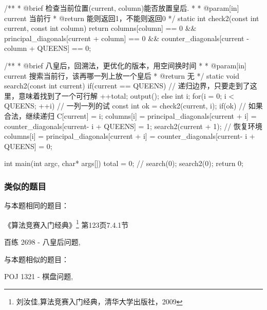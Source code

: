 \begin{Codex}[label=eight_queen.c]
/** 
 * @brief 检查当前位置(current, column)能否放置皇后.
 *
 * @param[in] current 当前行
 * @return 能则返回1，不能则返回0
 */
static int check2(const int current, const int column) {
    return columns[column] == 0 && principal_diagonals[current + column] == 0 
        && counter_diagonals[current - column + QUEENS] == 0;
}

/** 
 * @brief 八皇后，回溯法，更优化的版本，用空间换时间
 *
 * @param[in] current 搜索当前行，该再哪一列上放一个皇后
 * @return 无
 */
static void search2(const int current) {
    if(current == QUEENS) {  // 递归边界，只要走到了这里，意味着找到了一个可行解
        ++total;
        output();
    } else {
        int i;
        for(i = 0; i < QUEENS; ++i) {  // 一列一列的试
            const int ok = check2(current, i);
            if(ok) {  // 如果合法，继续递归
                C[current] = i;
                columns[i] = principal_diagonals[current + i] = 
                    counter_diagonals[current- i + QUEENS] = 1;
                search2(current + 1);
                // 恢复环境
                columns[i] = principal_diagonals[current + i] = 
                    counter_diagonals[current- i + QUEENS] = 0;
            }
        }
    }
}

int main(int argc, char* args[]) {
    total = 0;
    // search(0);
    search2(0);
    return 0;
}
\end{Codex}

\subsubsection{类似的题目}
与本题相同的题目：
\begindot
\item 《算法竞赛入门经典》\footnote{刘汝佳,算法竞赛入门经典，清华大学出版社，2009} 第123页7.4.1节
\item  百练 2698 - 八皇后问题, 
\myenddot

与本题相似的题目：
\begindot
\item POJ 1321 - 棋盘问题, 
\myenddot